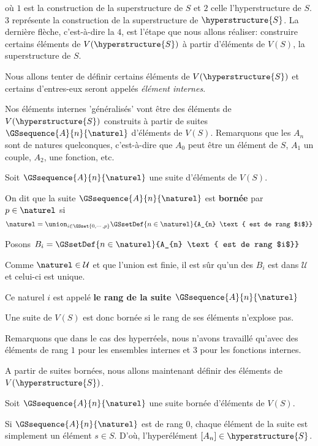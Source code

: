 \documentclass[a4paper, 12pt]{report}
\begin{document}
où $1$ est la construction de la superstructure de $S$ et $2$ celle
l'hyperstructure de $S$.
$3$ représente la construction de la superstructure de $\hyperstructure{S}$. La
dernière flèche, c'est-à-dire la $4$, est l'étape que nous allons réaliser:
construire certains éléments de $V(\hyperstructure{S})$ à partir d'éléments de
$V(S)$, la superstructure de $S$.

Nous allons tenter de définir certains éléments de $V(\hyperstructure{S})$ et
certains d'entres-eux seront appelés \textit{élément internes}.

Nos éléments internes 'généralisés' vont être des éléments de
$V(\hyperstructure{S})$ construits à partir de suites
$\GSsequence{A}{n}{\naturel}$ d'éléments de $V(S)$. Remarquons que les $A_{n}$
sont de natures quelconques, c'est-à-dire que $A_{0}$ peut être un élément de
$S$, $A_{1}$ un couple, $A_{2}$, une fonction, etc.


\begin{definition} 
	Soit $\GSsequence{A}{n}{\naturel}$ une suite d'éléments de $V(S)$.

	On dit que la suite $\GSsequence{A}{n}{\naturel}$ est \textbf{bornée} par $p
	\in \naturel$ si
	\begin{equation}
		\naturel = \union_{i \in \GSset{0, \cdots, p}} \GSsetDef{n
		\in \naturel}{A_{n} \text{ est de rang $i$}}
	\end{equation}

	Posons $B_{i} = \GSsetDef{n \in \naturel}{A_{n} \text{ est de rang $i$}}$

	Comme $\naturel \in \mathcal{U}$ et que l'union est finie, il est sûr qu'un
	des $B_{i}$ est dans $\mathcal{U}$ et celui-ci est unique.

	Ce naturel $i$ est appelé \textbf{le rang de la suite
		$\GSsequence{A}{n}{\naturel}$}
\end{definition}

Une suite de $V(S)$ est donc bornée si le rang de ses éléments n'explose pas.

Remarquons que dans le cas des hyperréels, nous n'avons travaillé qu'avec des
éléments de rang $1$ pour les ensembles internes et $3$ pour les fonctions
internes.

A partir de suites bornées, nous allons maintenant définir des éléments de
$V(\hyperstructure{S})$.

Soit $\GSsequence{A}{n}{\naturel}$ une suite bornée d'éléments de $V(S)$.

Si $\GSsequence{A}{n}{\naturel}$ est de rang $0$, chaque élément de la suite est
simplement un élément $s \in S$. D'où, l'hyperélément $[A_{n}] \in
\hyperstructure{S}$.
\end{document}
